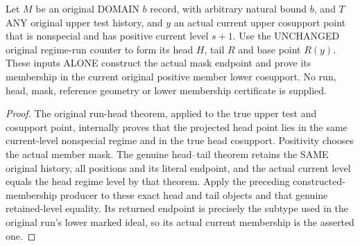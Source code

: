 \begin{theorem}
\label{hir:original-positive-member-actual-run-current-cosupport}
\leanok
Let $M$ be an original DOMAIN $b$ record, with arbitrary natural bound
$b$, and $T$ ANY original upper test
history, and $y$ an actual current upper cosupport point that is
nonspecial and has positive current level $s+1$. Use the UNCHANGED
original regime-run counter to form its head $H$, tail $R$ and base point
$R(y)$. These inputs ALONE construct the actual mask endpoint and prove
its membership in the current original positive member lower cosupport.
No run, head, mask, reference geometry or lower membership certificate
is supplied.
\end{theorem}
\begin{proof}
The original run-head theorem, applied to the true upper test and
cosupport point, internally proves that the projected head point lies
in the same current-level nonspecial regime and in the true head
cosupport. Positivity chooses the actual member mask. The genuine
head--tail theorem retains the SAME original history, all positions and
its literal endpoint, and the actual current level equals the head
regime level by that theorem. Apply the preceding constructed-membership
producer to these exact head and tail objects and that genuine
retained-level equality. Its returned endpoint is precisely the subtype
used in the original run's lower marked ideal, so its actual current
membership is the asserted one.
\end{proof}

